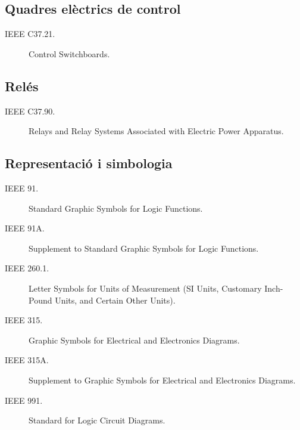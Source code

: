 \subsection*{Quadres elèctrics de control}
\begin{description}
    \item [\hspace{5mm}IEEE C37.21.] Control Switchboards.
\end{description}


\subsection*{Relés}
\begin{description}
    \item [\hspace{5mm}IEEE C37.90.] Relays and Relay Systems Associated with Electric Power Apparatus.
\end{description}


\subsection*{Representació i simbologia}
\begin{description}
    \item [\hspace{5mm}IEEE 91.] Standard Graphic Symbols for Logic Functions.
    \item [\hspace{5mm}IEEE 91A.] Supplement to Standard Graphic Symbols for Logic Functions.
    \item [\hspace{5mm}IEEE 260.1.] Letter Symbols for Units of Measurement (SI Units, Customary Inch-Pound Units, and Certain Other Units).
    \item [\hspace{5mm}IEEE 315.] Graphic Symbols for Electrical and Electronics Diagrams.
    \item [\hspace{5mm}IEEE 315A.] Supplement to Graphic Symbols for Electrical and Electronics Diagrams.
    \item [\hspace{5mm}IEEE 991.] Standard for Logic Circuit Diagrams.
\end{description}

